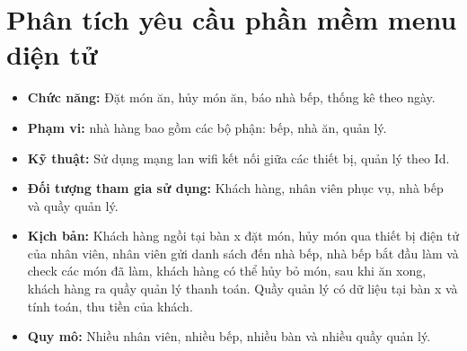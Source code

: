 \documentclass[a4paper,12pt]{report}
\begin{document}
\section{Phân tích yêu cầu phần mềm menu diện tử}
\begin{itemize}
	\item \textbf{Chức năng:} Đặt món ăn, hủy món ăn, báo nhà bếp, thống kê theo ngày.
	\item \textbf{Phạm vi:} nhà hàng bao gồm các bộ phận: bếp, nhà ăn, quản lý.
	\item \textbf{Kỹ thuật:} Sử dụng mạng lan wifi kết nối giữa các thiết bị, quản lý theo Id.
	\item \textbf{Đối tượng tham gia sử dụng:} Khách hàng, nhân viên phục vụ, nhà bếp và quầy quản lý.
	\item \textbf{Kịch bản:} Khách hàng ngồi tại bàn x đặt món, hủy món qua thiết bị điện tử của nhân viên,  nhân viên gửi danh sách đến nhà bếp, nhà bếp bắt đầu làm và check các món đã làm, khách hàng có thể hủy bỏ món, sau khi ăn xong, khách hàng ra quầy quản lý thanh toán. Quầy quản lý có dữ liệu tại bàn x và tính toán, thu tiền của khách.
	\item \textbf{Quy mô:} Nhiều nhân viên, nhiều bếp, nhiều bàn và nhiều quầy quản lý.
\end{itemize}
\pagebreak
\end{document}
